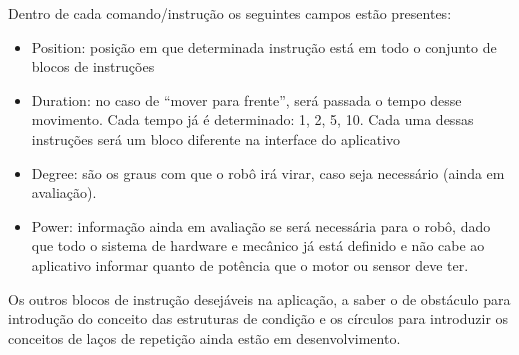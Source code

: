 Dentro de cada comando/instrução os seguintes campos estão presentes:
\begin{itemize}
\item Position: posição em que determinada instrução está em todo o conjunto de blocos de instruções
\item Duration: no caso de “mover para frente”, será passada o tempo desse movimento. Cada tempo já é determinado: 1, 2, 5, 10. Cada uma dessas instruções será um bloco diferente na interface do aplicativo
\item Degree: são os graus com que o robô irá virar, caso seja necessário (ainda em avaliação).
\item Power: informação ainda em avaliação se será necessária para o robô, dado que todo o sistema de hardware e mecânico já está definido e não cabe ao aplicativo informar quanto de potência que o motor ou sensor deve ter.
\end{itemize}

Os outros blocos de instrução desejáveis na aplicação, a saber o de obstáculo para introdução do conceito das estruturas de condição e os círculos para introduzir os conceitos de laços de repetição ainda estão em desenvolvimento.
